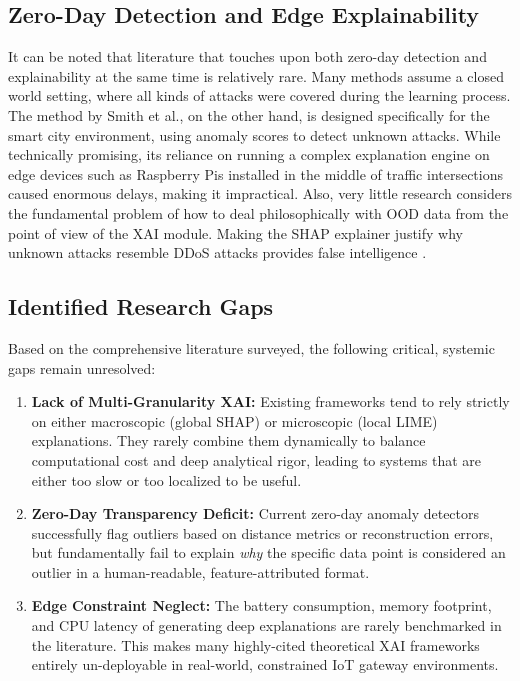 \documentclass[12pt]{article}
\begin{document}
    \subsection{Zero-Day Detection and Edge Explainability}
    It can be noted that literature that touches upon both zero-day detection and explainability at the same time is relatively rare. Many methods assume a closed world setting, where all kinds of attacks were covered during the learning process. The method by Smith et al.\cite{aspg2025zeroday}, on the other hand, is designed specifically for the smart city environment, using anomaly scores to detect unknown attacks. While technically promising, its reliance on running a complex explanation engine on edge devices such as Raspberry Pis installed in the middle of traffic intersections caused enormous delays, making it impractical. Also, very little research considers the fundamental problem of how to deal philosophically with OOD data from the point of view of the XAI module. Making the SHAP explainer justify why unknown attacks resemble DDoS attacks provides false intelligence \cite{islam2023robust}.

    \subsection{Identified Research Gaps}
    Based on the comprehensive literature surveyed, the following critical, systemic gaps remain unresolved:
    \begin{enumerate}
        \item \textbf{Lack of Multi-Granularity XAI:} Existing frameworks tend to rely strictly on either macroscopic (global SHAP) or microscopic (local LIME) explanations. They rarely combine them dynamically to balance computational cost and deep analytical rigor, leading to systems that are either too slow or too localized to be useful.
        \item \textbf{Zero-Day Transparency Deficit:} Current zero-day anomaly detectors successfully flag outliers based on distance metrics or reconstruction errors, but fundamentally fail to explain \textit{why} the specific data point is considered an outlier in a human-readable, feature-attributed format.
        \item \textbf{Edge Constraint Neglect:} The battery consumption, memory footprint, and CPU latency of generating deep explanations are rarely benchmarked in the literature. This makes many highly-cited theoretical XAI frameworks entirely un-deployable in real-world, constrained IoT gateway environments.
    \end{enumerate}
\end{document}
